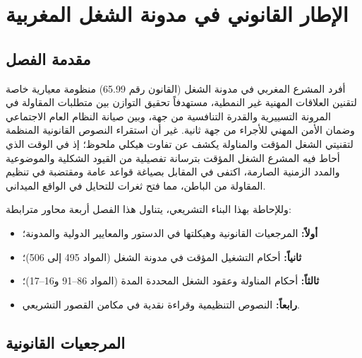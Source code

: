 
\chapter{الإطار القانوني في مدونة الشغل المغربية}
\label{chap:chapitre2}

\section*{مقدمة الفصل}

أفرد المشرع المغربي في مدونة الشغل (القانون رقم \textenglish{65.99}) منظومة معيارية خاصة لتقنين العلاقات المهنية غير النمطية، مستهدفاً تحقيق التوازن بين متطلبات المقاولة في المرونة التسييرية والقدرة التنافسية من جهة، وبين صيانة النظام العام الاجتماعي وضمان الأمن المهني للأجراء من جهة ثانية. غير أن استقراء النصوص القانونية المنظمة لتقنيتي الشغل المؤقت والمناولة يكشف عن تفاوت هيكلي ملحوظ؛ إذ في الوقت الذي أحاط فيه المشرع الشغل المؤقت بترسانة تفصيلية من القيود الشكلية والموضوعية والمدد الزمنية الصارمة، اكتفى في المقابل بصياغة قواعد عامة ومقتضبة في تنظيم المقاولة من الباطن، مما فتح ثغرات للتحايل في الواقع الميداني.

وللإحاطة بهذا البناء التشريعي، يتناول هذا الفصل أربعة محاور مترابطة:
\begin{itemize}[leftmargin=*, itemsep=4pt]
    \item \textbf{أولاً:} المرجعيات القانونية وهيكلتها في الدستور والمعايير الدولية والمدونة؛
    \item \textbf{ثانياً:} أحكام التشغيل المؤقت في مدونة الشغل (المواد \textenglish{495} إلى \textenglish{506})؛
    \item \textbf{ثالثاً:} أحكام المناولة وعقود الشغل المحددة المدة (المواد \textenglish{86}--\textenglish{91} و\textenglish{16}--\textenglish{17})؛
    \item \textbf{رابعاً:} النصوص التنظيمية وقراءة نقدية في مكامن القصور التشريعي.
\end{itemize}

\section{المرجعيات القانونية}

